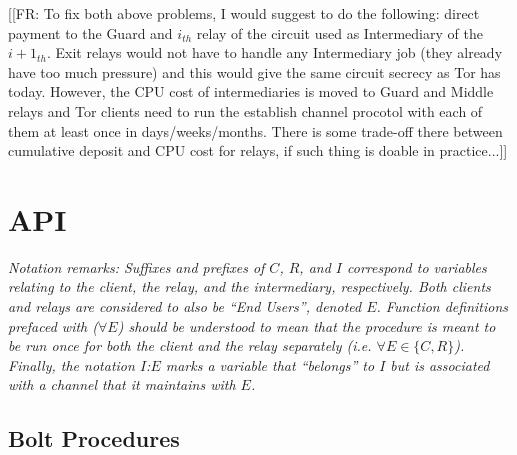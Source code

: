 \documentclass{article}
\newcommand{\flo}[1]{ {\color{blue} [[FR: #1]]}}
\begin{document}
\flo{To fix both above problems, I would suggest to do the following: direct payment to the Guard and $i_{th}$ relay of the circuit used as Intermediary of the $i+1_{th}$. Exit relays would not have to handle any Intermediary job (they already have too much pressure) and this would give the same circuit secrecy as Tor has today. However, the CPU cost of intermediaries is moved to Guard and Middle relays and Tor clients need to run the establish channel procotol with each of them at least once in days/weeks/months. There is some trade-off there between cumulative deposit and CPU cost for relays, if such thing is doable in practice...}

\section{API}

\textit{Notation remarks: Suffixes and prefixes of $C$, $R$, and $I$ correspond to variables relating to the client, the relay, and the intermediary, respectively. Both clients and relays are considered to also be ``End Users'', denoted $E$. Function definitions prefaced with ($\forall E$) should be understood to mean that the procedure is meant to be run once for both the client and the relay separately (i.e. $\forall E \in \{C, R\}$). Finally, the notation $I$:$E$ marks a variable that ``belongs'' to $I$ but is associated with a channel that it maintains with $E$.}

\subsection{Bolt Procedures}
\end{document}
